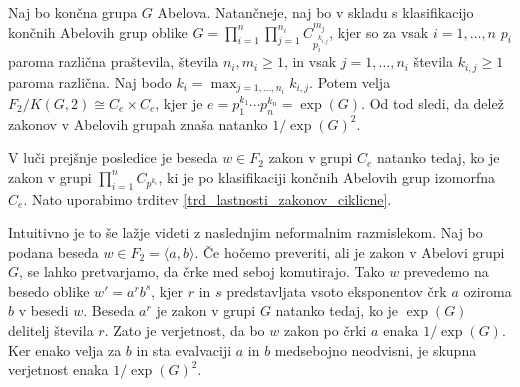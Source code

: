 \begin{posledica}
\label{psl_lastnosti_zakonov_splosni_produkti_ciklicnih}
Naj bo končna grupa $G$ Abelova. Natančneje, naj bo v skladu s klasifikacijo končnih Abelovih grup oblike $G = \prod_{i = 1}^{n} \prod_{j = 1}^{n_i} C_{p_{i}^{k_{i,j}}}^{m_j}$, kjer so za vsak $i = 1, \ldots, n$ $p_i$ paroma različna praštevila, števila $n_i, m_{i} \ge 1$, in vsak $j = 1, \ldots , n_i$ števila $k_{i, j} \ge 1$ paroma različna. %
Naj bodo $k_i = \max_{j = 1, \ldots, n_i} k_{i,j}$. Potem velja $F_2 / K(G, 2) \cong C_{e} \times C_{e}$, kjer je $e = p_1^{k_1} \cdots  p_n^{k_n}  = \exp(G)$.
Od tod sledi, da delež zakonov v Abelovih grupah znaša natanko $1 / \exp(G)^2$.
\end{posledica}
\begin{dokaz}
V luči prejšnje posledice je beseda $w \in F_2$ zakon v grupi $C_e$ natanko tedaj, ko je zakon v grupi $\prod_{i = 1}^{n} C_{p^{k_i}}$, ki je po klasifikaciji končnih Abelovih grup izomorfna $C_e$.
Nato uporabimo trditev \ref{trd_lastnosti_zakonov_ciklicne}.
\end{dokaz}
Intuitivno je to še lažje videti z naslednjim neformalnim razmislekom.
Naj bo podana beseda $w \in F_2 = \langle a, b \rangle$. Če hočemo preveriti, ali je zakon v Abelovi grupi $G$, se lahko pretvarjamo, da črke med seboj komutirajo. Tako $w$ prevedemo na besedo oblike $w' = a^r b^s$,
kjer $r$ in $s$ predstavljata vsoto eksponentov črk $a$ oziroma $b$ v besedi $w$. Beseda $a^r$ je zakon v grupi $G$ natanko tedaj, ko je $\exp(G)$ delitelj števila $r$. Zato je verjetnost, da bo $w$ zakon po črki $a$ enaka $1 / \exp(G)$. %
Ker enako velja za $b$ in sta evalvaciji $a$ in $b$ medsebojno neodvisni, je skupna verjetnost enaka $1 / \exp(G)^2$.




